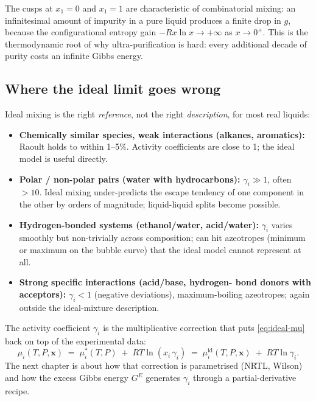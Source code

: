 \documentclass[11pt,a4paper]{article}
\begin{document}
\begin{intuition}
The cusps at $x_1 = 0$ and $x_1 = 1$ are characteristic of
combinatorial mixing: an infinitesimal amount of impurity in a pure
liquid produces a finite drop in $g$, because the configurational
entropy gain $-R x \ln x \to +\infty$ as $x \to 0^+$.  This is the
thermodynamic root of why ultra-purification is hard: every
additional decade of purity costs an infinite Gibbs energy.
\end{intuition}

\subsection{Where the ideal limit goes wrong}

Ideal mixing is the right \emph{reference}, not the right
\emph{description}, for most real liquids:

\begin{itemize}[leftmargin=*,nosep]
  \item \textbf{Chemically similar species, weak interactions
        (alkanes, aromatics):} Raoult holds to within 1--5\%.
        Activity coefficients are close to 1; the ideal model is
        useful directly.
  \item \textbf{Polar / non-polar pairs (water with hydrocarbons):}
        $\gamma_i \gg 1$, often $> 10$.  Ideal mixing under-predicts
        the escape tendency of one component in the other by orders
        of magnitude; liquid-liquid splits become possible.
  \item \textbf{Hydrogen-bonded systems (ethanol/water, acid/water):}
        $\gamma_i$ varies smoothly but non-trivially across
        composition; can hit azeotropes (minimum or maximum on the
        bubble curve) that the ideal model cannot represent at all.
  \item \textbf{Strong specific interactions (acid/base, hydrogen-
        bond donors with acceptors):} $\gamma_i < 1$ (negative
        deviations), maximum-boiling azeotropes; again outside the
        ideal-mixture description.
\end{itemize}

The activity coefficient $\gamma_i$ is the multiplicative correction
that puts \eqref{eq:ideal-mu} back on top of the experimental data:
\begin{equation}
   \mu_i(T, P, \mathbf{x})
   \;=\; \mu_i^*(T, P) \;+\; RT \ln(x_i\,\gamma_i)
   \;=\; \mu_i^{\mathrm{id}}(T, P, \mathbf{x}) \;+\; RT \ln \gamma_i.
\end{equation}
The next chapter is about how that correction is parametrised
(NRTL, Wilson) and how the excess Gibbs energy $G^E$ generates
$\gamma_i$ through a partial-derivative recipe.
\end{document}
